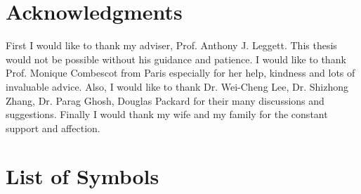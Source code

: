\documentclass[edeposit,fullpage,prequest,10pt]{uiucthesis2009}
\begin{document}
\chapter*{Acknowledgments}
First I would like to thank my adviser, Prof. Anthony J. Leggett.  This thesis would not be possible without his guidance and patience.  I would like to thank Prof. Monique Combescot from Paris especially for her help, kindness and lots of invaluable advice.  Also, I would like to thank Dr. Wei-Cheng Lee, Dr. Shizhong Zhang, Dr. Parag Ghosh,  Douglas
Packard  for their many discussions and suggestions.  Finally I would thank my wife and my family for the constant support and affection.  


\tableofcontents

%

\chapter{List of Symbols}
\end{document}
